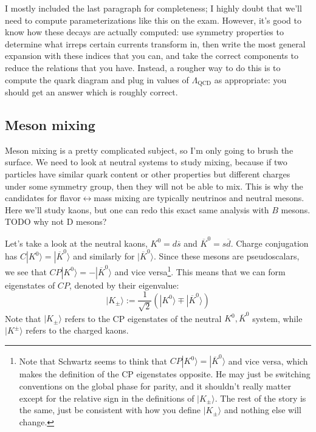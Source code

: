 \documentclass[11pt, oneside]{article}   	%
\theoremstyle{definition}
\numberwithin{equation}{subsection}		%
\begin{document}
I mostly included the last paragraph for completeness; I highly doubt that we'll need to compute parameterizations like this on the exam. However, 
it's good to know how these decays are actually computed: use symmetry properties to determine what irreps certain currents transform in, then 
write the most general expansion with these indices that you can, and take the correct components to reduce the relations that you have. 
Instead, a rougher way to do this is to compute the quark diagram and plug in values of $\Lambda_\mathrm{QCD}$ as appropriate: you should 
get an answer which is roughly correct. 


\subsection{Meson mixing}

Meson mixing is a pretty complicated subject, so I'm only going to brush the surface. 
We need to look at neutral systems to study mixing, because if two particles have similar quark content or other 
properties but different charges under some symmetry group, then they will not be able to mix. This is why the candidates for flavor$\leftrightarrow$mass 
mixing are typically neutrinos and neutral mesons. Here we'll study kaons, but one can redo this exact same analysis with $B$ mesons. 
{\color{red} TODO why not D mesons?}

Let's take a look at the neutral kaons, $K^0 = d\overline s$ and $\overline K^0 = s\overline d$. 
Charge conjugation has $C|K^0\rangle = |\overline K^0\rangle$ and similarly for $|\overline K^0\rangle$. Since these mesons are 
pseudoscalars, we see that $CP|K^0\rangle = - |\overline K^0\rangle$ and vice versa\footnote{Note that Schwartz seems to think that $CP|K^0\rangle 
= |\overline K^0\rangle$ and vice versa, which makes the definition of the CP eigenstates opposite. He may just be switching conventions 
on the global phase for parity, and it shouldn't really matter except for the relative sign in the definitions of $|K_\pm\rangle$. The 
rest of the story is the same, just be consistent with how you define $|K_\pm\rangle$ and nothing else will change.}. 
This means that we can form eigenstates of $CP$, denoted by their eigenvalue:
\begin{equation}
	|K_\pm\rangle := \frac{1}{\sqrt 2}\left( |K^0\rangle\mp |\overline K^0\rangle\right)
\end{equation}
Note that $|K_\pm\rangle$ refers to the CP eigenstates of the neutral $K^0, \overline K^0$ system, while $|K^\pm\rangle$ refers to the charged kaons. 
\end{document}
